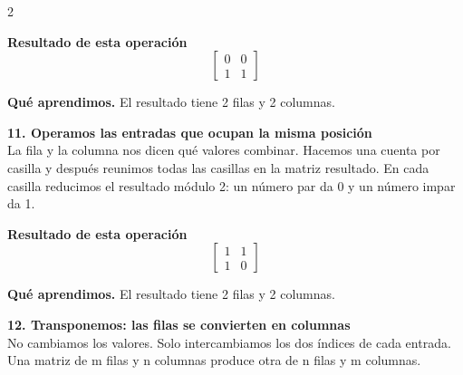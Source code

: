 \documentclass[11pt,a4paper,landscape]{article}
\begin{document}
\begin{multicols*}{2}
\begin{minipage}{\linewidth}
\par\smallskip \textbf{Resultado de esta operación}\[\begin{bmatrix}0 & 0\\1 & 1\end{bmatrix}\]
\par\smallskip\textbf{Qué aprendimos.} El resultado tiene 2 filas y 2 columnas.
\end{minipage}\par\medskip
\noindent\begin{minipage}{\linewidth}\textbf{11. Operamos las entradas que ocupan la misma posición}\\[2pt]La fila y la columna nos dicen qué valores combinar. Hacemos una cuenta por casilla y después reunimos todas las casillas en la matriz resultado. En cada casilla reducimos el resultado módulo 2: un número par da 0 y un número impar da 1.
\par{}\par\smallskip
\par\smallskip \textbf{Resultado de esta operación}\[\begin{bmatrix}1 & 1\\1 & 0\end{bmatrix}\]
\par\smallskip\textbf{Qué aprendimos.} El resultado tiene 2 filas y 2 columnas.
\end{minipage}\par\medskip
\noindent\begin{minipage}{\linewidth}\textbf{12. Transponemos: las filas se convierten en columnas}\\[2pt]No cambiamos los valores. Solo intercambiamos los dos índices de cada entrada. Una matriz de m filas y n columnas produce otra de n filas y m columnas.

\end{minipage}
\end{multicols*}
\end{document}
